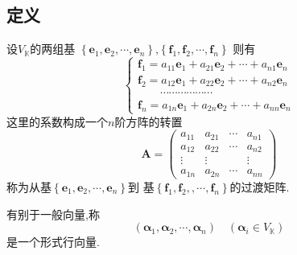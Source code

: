 \subsection{定义}
\begin{formal}
\begin{definition}[过渡矩阵]\label{def:过渡矩阵}
    设$V_{\mathbb{K}}$的两组基
    $\left\{\bm{e}_1,\bm{e}_2,\cdots,
    \bm{e}_n\right\}$,$
    \left\{\bm{f}_1,\bm{f}_2
    ,\cdots,\bm{f}_n\right\}$
    则有\[
    \begin{cases*}
        \bm{f}_1 = a_{11}\bm{e}_1+a_{21}\bm{e}_2
        +\cdots+a_{n1}\bm{e}_n\\
        \bm{f}_2=a_{12}\bm{e}_1+a_{22}\bm{e}_2+\cdots+
        a_{n2}\bm{e}_n\\
        \qquad\cdots\cdots
        \cdots\cdots\cdots\cdots\\
        \bm{f}_n=a_{1n}\bm{e}_1+a_{2n}\bm{e}_2+\cdots
        +a_{nn}\bm{e}_n   
    \end{cases*}
    \]
    这里的系数构成一个$n$阶方阵的转置
    \[
    \bm{A} = \begin{pmatrix}
        a_{11} & a_{21}&\cdots & a_{n1} \\
        a_{12}&a_{22}&\cdots&a_{n2}\\
        \vdots & \vdots& & \vdots \\
        a_{1n} & a_{2n}&\cdots & a_{nn}
    \end{pmatrix}
    \]
    称为从基$\left\{\bm{e}_1,\bm{e}_2,\cdots,
    \bm{e}_n\right\}$到
    基$
    \left\{\bm{f}_1,\bm{f}_2,
    ,\cdots,\bm{f}_n\right\}$的过渡矩阵.
\end{definition}
\end{formal}
\begin{formal}
\begin{definition}[形式行向量]\label{def:形式行向量}
    有别于一般向量,称
    \[
    \left(\bm{\alpha}_1,\bm{\alpha}_2,\cdots
    ,\bm{\alpha}_n\right) \quad
    \left(\bm{\alpha}_i \in V_{
        \mathbb{K}
    }\right)
    \]
    是一个形式行向量.
\end{definition}
\end{formal}
